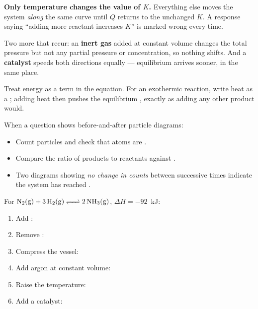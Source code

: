 \documentclass{apchem-notes}
\begin{document}
\begin{apctrap}
\textbf{Only temperature changes the value of $K$.} Everything else moves
the system \emph{along} the same curve until $Q$ returns to the unchanged
$K$. A response saying ``adding more reactant increases $K$'' is marked
wrong every time.

Two more that recur: an \textbf{inert gas} added at constant volume changes
the total pressure but not any partial pressure or concentration, so
nothing shifts. And a \textbf{catalyst} speeds both directions equally ---
equilibrium arrives sooner, in the same place.
\end{apctrap}


Treat energy as a term in the equation. For an exothermic reaction, write
heat as a ; adding heat then pushes the
equilibrium , exactly as adding any other product
would.



When a question shows before-and-after particle diagrams:

\begin{itemize}[leftmargin=*,itemsep=0.3em]
  \item Count particles and check that atoms are
        .
  \item Compare the ratio of products to reactants against
        .
  \item Two diagrams showing \emph{no change in counts} between successive
        times indicate the system has reached
        .
\end{itemize}


For $\ce{N2(g) + 3H2(g) <=> 2NH3(g)}$, $\Delta H = -92$~kJ:

\begin{enumerate}[leftmargin=*,itemsep=0.35em]
  \item Add : 
  \item Remove : 
  \item Compress the vessel: 
  \item Add argon at constant volume:
  \item Raise the temperature:
  \item Add a catalyst: 
\end{enumerate}
\end{document}
